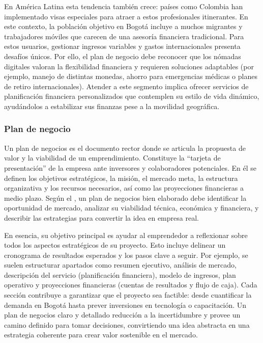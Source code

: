 En América Latina esta tendencia también crece: países como Colombia han implementado visas especiales para atraer a estos profesionales itinerantes. En este contexto, la población objetivo en Bogotá incluye a muchos migrantes y trabajadores móviles que carecen de una asesoría financiera tradicional. Para estos usuarios, gestionar ingresos variables y gastos internacionales presenta desafíos únicos. Por ello, el plan de negocio debe reconocer que los nómadas digitales valoran la flexibilidad financiera y requieren soluciones adaptables (por ejemplo, manejo de distintas monedas, ahorro para emergencias médicas o planes de retiro internacionales). Atender a este segmento implica ofrecer servicios de planificación financiera personalizados que contemplen su estilo de vida dinámico, ayudándolos a estabilizar sus finanzas pese a la movilidad geográfica.

\subsubsection*{Plan de negocio}
Un plan de negocios es el documento rector donde se articula la propuesta de valor y la viabilidad de un emprendimiento. Constituye la “tarjeta de presentación” de la empresa ante inversores y colaboradores potenciales. En él se definen los objetivos estratégicos, la misión, el mercado meta, la estructura organizativa y los recursos necesarios, así como las proyecciones financieras a medio plazo. Según el \textcite{BBVA01}, un plan de negocios bien elaborado debe identificar la oportunidad de mercado, analizar su viabilidad técnica, económica y financiera, y describir las estrategias para convertir la idea en empresa real. 

En esencia, su objetivo principal es ayudar al emprendedor a reflexionar sobre todos los aspectos estratégicos de su proyecto. Esto incluye delinear un cronograma de resultados esperados y los pasos clave a seguir. Por ejemplo, se suelen estructurar apartados como resumen ejecutivo, análisis de mercado, descripción del servicio (planificación financiera), modelo de ingresos, plan operativo y proyecciones financieras (cuentas de resultados y flujo de caja). Cada sección contribuye a garantizar que el proyecto sea factible: desde cuantificar la demanda en Bogotá hasta prever inversiones en tecnología o capacitación. Un plan de negocios claro y detallado reducción a la incertidumbre y provee un camino definido para tomar decisiones, convirtiendo una idea abstracta en una estrategia coherente para crear valor sostenible en el mercado.

